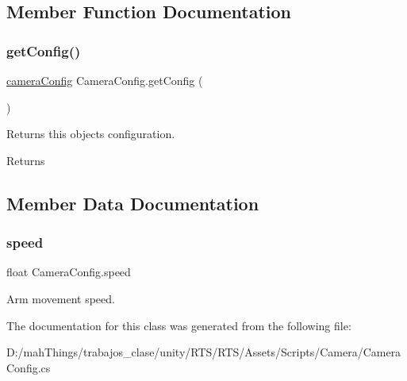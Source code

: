 \subsection{Member Function Documentation}
\mbox{\label{class_camera_config_a4ae099d8e77eb955a53f223f2bbc7279}} 
\subsubsection{\texorpdfstring{get\+Config()}{getConfig()}}
{\footnotesize\ttfamily \mbox{\hyperlink{structcamera_config}{camera\+Config}} Camera\+Config.\+get\+Config (\begin{DoxyParamCaption}{ }\end{DoxyParamCaption})}



Returns this objects configuration. 

\begin{DoxyReturn}{Returns}

\end{DoxyReturn}


\subsection{Member Data Documentation}
\mbox{\label{class_camera_config_a697a6874e8f2c7ab709fe6f0b9d71238}} 
\subsubsection{\texorpdfstring{speed}{speed}}
{\footnotesize\ttfamily float Camera\+Config.\+speed}



Arm movement speed. 



The documentation for this class was generated from the following file\+:\begin{DoxyCompactItemize}
\item 
D\+:/mah\+Things/trabajos\+\_\+clase/unity/\+R\+T\+S/\+R\+T\+S/\+Assets/\+Scripts/\+Camera/Camera\+Config.\+cs\end{DoxyCompactItemize}
